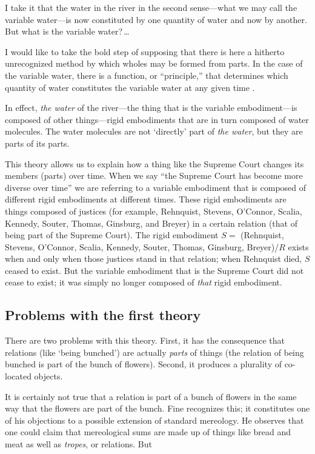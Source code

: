 \documentclass[11pt]{article}
\newenvironment{squote}{%
\begin{spacing}{1}
\begin{list}{}{%
\setlength{\labelwidth}{0pt}%
\rightmargin\leftmargin%
}
\item\relax
}{%
\end{list}%
\end{spacing}
}
\begin{document}
\begin{spacing}{1.5}
\begin{squote}
I take it that the water in the river in the second sense---what we may
call the variable water---is now constituted by one quantity of water
and now by another. But what is the variable water?\,\ldots

I would like to take the bold step of supposing that there is here a
hitherto unrecognized method by which wholes may be formed from parts.
In the case of the variable water, there is a function, or
``principle,'' that determines which quantity of water constitutes the
variable water at any given time \citeyearpar[68]{fine1999}.
\end{squote}

In effect, {\em the water} of the river---the thing that is the
variable embodiment---is composed of other things---rigid embodiments
that are in turn composed of water molecules.  The water molecules are
not `directly' part of {\em the water}, but they are parts of its
parts.

This theory allows us to explain how a thing like the Supreme Court
changes its members (parts) over time.  When we say ``the Supreme
Court has become more diverse over time'' we are referring to a
variable embodiment that is composed of different rigid embodiments at
different times.  These rigid embodiments are things composed of
justices (for example, Rehnquist, Stevens, O'Connor, Scalia, Kennedy,
Souter, Thomas, Ginsburg, and Breyer) in a certain relation (that of
being part of the Supreme Court).  The rigid embodiment $S =$
(Rehnquist, Stevens, O'Connor, Scalia, Kennedy, Souter, Thomas,
Ginsburg, Breyer)/$R$ exists when and only when those justices stand
in that relation; when Rehnquist died, $S$ ceased to exist.  But the
variable embodiment that is the Supreme Court did not cease to exist;
it was simply no longer composed of {\em that} rigid embodiment.

\subsection{Problems with the first theory}
\label{problems1}
There are two problems with this theory.  First, it has the
consequence that relations (like `being bunched') are actually {\em
  parts} of things (the relation of being bunched is part of the bunch
of flowers).  Second, it produces a plurality of co-located objects.

It is certainly not true that a relation is part of a bunch of flowers
in the same way that the flowers are part of the bunch.  Fine
recognizes this; it constitutes one of his objections to a possible
extension of standard mereology.  He observes that one could claim
that mereological sums are made up of things like bread and meat as
well as {\em tropes}, or relations.  But


\end{spacing}
\end{document}
